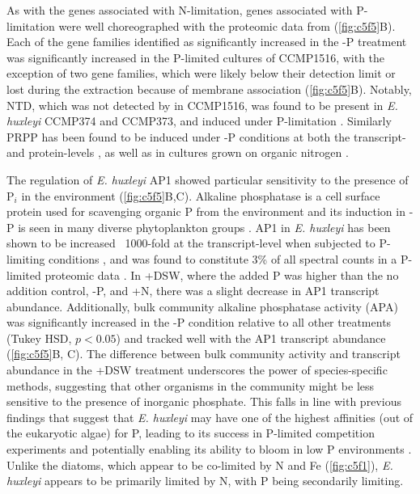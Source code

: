 As with the genes associated with N-limitation, genes associated with P-limitation were well choreographed with the proteomic data from \citet{McKew2015} (\cref{fig:c5f5}B). Each of the gene families identified as significantly increased in the -P treatment was significantly increased in the P-limited cultures of CCMP1516, with the exception of two gene families, which were likely below their detection limit or lost during the extraction because of membrane association (\cref{fig:c5f5}B). Notably, NTD, which was not detected by \citet{McKew2015} in CCMP1516, was found to be present in \textit{E. huxleyi} CCMP374 and CCMP373, and induced under P-limitation \citep{Dyhrman2003}. Similarly PRPP has been found to be induced under -P conditions at both the transcript- \citep{Dyhrman2006} and protein-levels \citep{McKew2015}, as well as in cultures grown on organic nitrogen \citep{Bruhn2010}. \par

The regulation of \textit{E. huxleyi} AP1 showed particular sensitivity to the presence of P$_i$ in the environment (\cref{fig:c5f5}B,C). Alkaline phosphatase is a cell surface protein used for scavenging organic P from the environment and its induction in -P is seen in many diverse phytoplankton groups \citep{Sakshaug1984, Dyhrman1997, Dyhrman2003, Wurch2011}. AP1 in \textit{E. huxleyi} has been shown to be increased ~1000-fold at the transcript-level when subjected to P-limiting conditions \citep{Xu2006}, and was found to constitute 3\% of all spectral counts in a P-limited proteomic data \citep{McKew2015}. In +DSW, where the added P was higher than the no addition control, -P, and +N, there was a slight decrease in AP1 transcript abundance. Additionally, bulk community alkaline phosphatase activity (APA) was significantly increased in the -P condition relative to all other treatments (Tukey HSD, $p < 0.05$) and tracked well with the AP1 transcript abundance (\cref{fig:c5f5}B, C). The difference between bulk community activity and transcript abundance in the +DSW treatment underscores the power of species-specific methods, suggesting that other organisms in the community might be less sensitive to the presence of inorganic phosphate. This falls in line with previous findings that suggest that \textit{E. huxleyi} may have one of the highest affinities (out of the eukaryotic algae) for P, leading to its success in P-limited competition experiments \citep{Riegman2000} and potentially enabling its ability to bloom in low P environments \citep{Lessard2005}. Unlike the diatoms, which appear to be co-limited by N and Fe (\cref{fig:c5f1}), \textit{E. huxleyi} appears to be primarily limited by N, with P being secondarily limiting. \par


